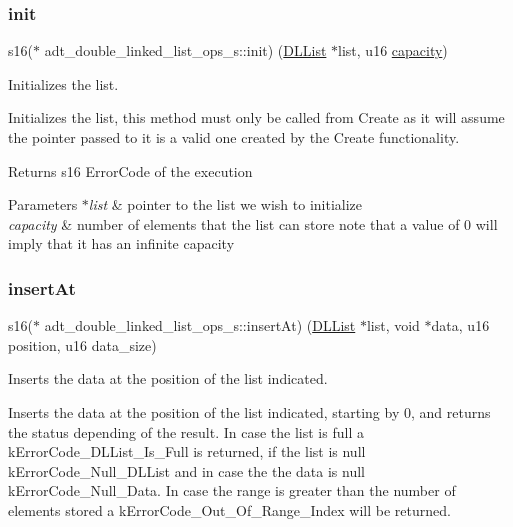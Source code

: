 \subsubsection{\texorpdfstring{init}{init}}
{\footnotesize\ttfamily s16($\ast$ adt\+\_\+double\+\_\+linked\+\_\+list\+\_\+ops\+\_\+s\+::init) (\hyperlink{structadt__double__linked__list__s}{D\+L\+List} $\ast$list, u16 \hyperlink{structadt__double__linked__list__ops__s_adfa3417ca009567eeb9382f735cf6482}{capacity})}



Initializes the list. 

Initializes the list, this method must only be called from Create as it will assume the pointer passed to it is a valid one created by the Create functionality.

\begin{DoxyReturn}{Returns}
s16 Error\+Code of the execution 
\end{DoxyReturn}

\begin{DoxyParams}{Parameters}
{\em $\ast$list} & pointer to the list we wish to initialize \\
\hline
{\em capacity} & number of elements that the list can store note that a value of 0 will imply that it has an infinite capacity \\
\hline
\end{DoxyParams}
\mbox{\label{structadt__double__linked__list__ops__s_a57e91557be99866b581edd146111b921}} 
\subsubsection{\texorpdfstring{insert\+At}{insertAt}}
{\footnotesize\ttfamily s16($\ast$ adt\+\_\+double\+\_\+linked\+\_\+list\+\_\+ops\+\_\+s\+::insert\+At) (\hyperlink{structadt__double__linked__list__s}{D\+L\+List} $\ast$list, void $\ast$data, u16 position, u16 data\+\_\+size)}



Inserts the data at the position of the list indicated. 

Inserts the data at the position of the list indicated, starting by 0, and returns the status depending of the result. In case the list is full a k\+Error\+Code\+\_\+\+D\+L\+List\+\_\+\+Is\+\_\+\+Full is returned, if the list is null k\+Error\+Code\+\_\+\+Null\+\_\+\+D\+L\+List and in case the the data is null k\+Error\+Code\+\_\+\+Null\+\_\+\+Data. In case the range is greater than the number of elements stored a k\+Error\+Code\+\_\+\+Out\+\_\+\+Of\+\_\+\+Range\+\_\+\+Index will be returned.

